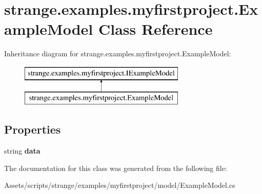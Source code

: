 \hypertarget{classstrange_1_1examples_1_1myfirstproject_1_1_example_model}{\section{strange.\-examples.\-myfirstproject.\-Example\-Model Class Reference}
\label{classstrange_1_1examples_1_1myfirstproject_1_1_example_model}
}
Inheritance diagram for strange.\-examples.\-myfirstproject.\-Example\-Model\-:\begin{figure}[H]
\begin{center}
\leavevmode
\includegraphics[height=2.000000cm]{classstrange_1_1examples_1_1myfirstproject_1_1_example_model}
\end{center}
\end{figure}
\subsection*{Properties}
\begin{DoxyCompactItemize}
\item 
\hypertarget{classstrange_1_1examples_1_1myfirstproject_1_1_example_model_a5e996c004eb1aca4e3ef3bb8966575d2}{string {\bfseries data}}\label{classstrange_1_1examples_1_1myfirstproject_1_1_example_model_a5e996c004eb1aca4e3ef3bb8966575d2}

\end{DoxyCompactItemize}


The documentation for this class was generated from the following file\-:\begin{DoxyCompactItemize}
\item 
Assets/scripts/strange/examples/myfirstproject/model/Example\-Model.\-cs\end{DoxyCompactItemize}
